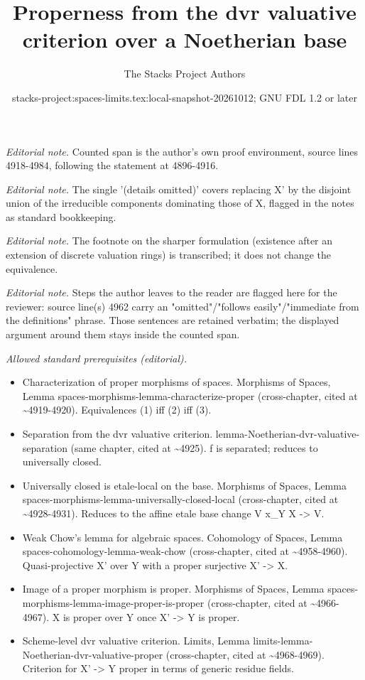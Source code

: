 \documentclass{stacks-project}
\title{Properness from the dvr valuative criterion over a Noetherian base}
\author{The Stacks Project Authors}
\date{stacks-project:spaces-limits.tex:local-snapshot-20261012; GNU FDL 1.2 or later}
\theoremstyle{plain}
\theoremstyle{definition}
\theoremstyle{remark}
\numberwithin{equation}{subsection}
\begin{document}
\maketitle
\noindent\textit{Editorial note.} Counted span is the author's own proof environment, source lines 4918-4984, following the statement at 4896-4916.\par\medskip
\noindent\textit{Editorial note.} The single '(details omitted)' covers replacing X' by the disjoint union of the irreducible components dominating those of X, flagged in the notes as standard bookkeeping.\par\medskip
\noindent\textit{Editorial note.} The footnote on the sharper formulation (existence after an extension of discrete valuation rings) is transcribed; it does not change the equivalence.\par\medskip
\noindent\textit{Editorial note.} Steps the author leaves to the reader are flagged here for the reviewer: source line(s) 4962 carry an "omitted"/"follows easily"/"immediate from the definitions" phrase. Those sentences are retained verbatim; the displayed argument around them stays inside the counted span.\par\medskip
\noindent\textit{Allowed standard prerequisites (editorial).}\begin{itemize}
\item Characterization of proper morphisms of spaces. Morphisms of Spaces, Lemma spaces-morphisms-lemma-characterize-proper (cross-chapter, cited at \textasciitilde{}4919-4920). Equivalences (1) iff (2) iff (3).
\item Separation from the dvr valuative criterion. lemma-Noetherian-dvr-valuative-separation (same chapter, cited at \textasciitilde{}4925). f is separated; reduces to universally closed.
\item Universally closed is etale-local on the base. Morphisms of Spaces, Lemma spaces-morphisms-lemma-universally-closed-local (cross-chapter, cited at \textasciitilde{}4928-4931). Reduces to the affine etale base change V x\_Y X -> V.
\item Weak Chow's lemma for algebraic spaces. Cohomology of Spaces, Lemma spaces-cohomology-lemma-weak-chow (cross-chapter, cited at \textasciitilde{}4958-4960). Quasi-projective X' over Y with a proper surjective X' -> X.
\item Image of a proper morphism is proper. Morphisms of Spaces, Lemma spaces-morphisms-lemma-image-proper-is-proper (cross-chapter, cited at \textasciitilde{}4966-4967). X is proper over Y once X' -> Y is proper.
\item Scheme-level dvr valuative criterion. Limits, Lemma limits-lemma-Noetherian-dvr-valuative-proper (cross-chapter, cited at \textasciitilde{}4968-4969). Criterion for X' -> Y proper in terms of generic residue fields.
\end{itemize}\medskip
\end{document}
